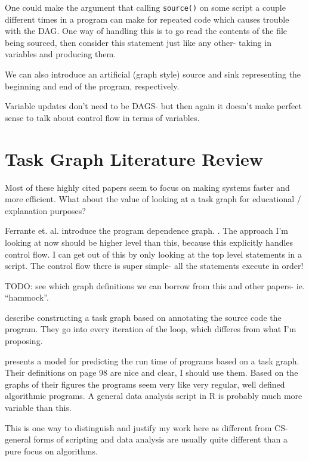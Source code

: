\documentclass[12pt]{article}
\begin{document}
One could make the argument that calling \texttt{source()} on some script
a couple different times in a program can make for repeated code which
causes trouble with the DAG. One way of handling this is to go read the
contents of the file being sourced, then consider this statement just like
any other- taking in variables and producing them.

We can also introduce an artificial (graph style) source and sink representing the
beginning and end of the program, respectively.

Variable updates don't need to be DAGS- but then again it doesn't make
perfect sense to talk about control flow in terms of variables.

\section{Task Graph Literature Review}

Most of these highly cited papers seem to focus on making systems faster
and more efficient. What about the value of looking at a task graph for
educational / explanation purposes?

Ferrante et. al. introduce the program dependence graph.
\cite{ferrante1987}. The approach I'm looking at now should be higher level
than this, because this explicitly handles control flow. I can get out of
this by only looking at the top level statements in a script. The control
flow there is super simple- all the statements execute in order!

TODO: see which graph definitions we can borrow from this and other papers-
ie. ``hammock''.

\cite{cosnard1995automatic} describe constructing a task graph based on
annotating the source code the program. They go into every iteration of the
loop, which differes from what I'm proposing.

\cite{adve2004parallel} presents a model for predicting the run time of
programs based on a task graph. 
Their definitions on page 98 are nice and clear, I should use them.
Based on the graphs of their figures the
programs seem very like very regular, well defined algorithmic programs. A
general data analysis script in R is probably much more variable than this.

This is one way to distinguish and justify my work here as different from
CS- general forms of scripting and data analysis are usually quite
different than a pure focus on algorithms.
\end{document}
